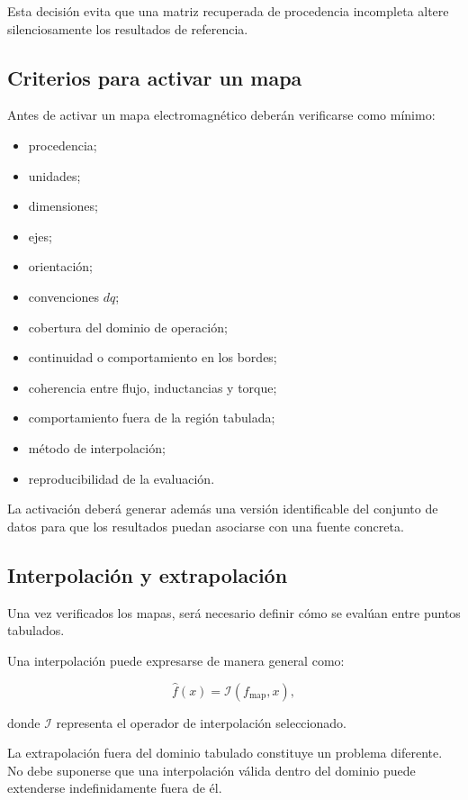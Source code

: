 Esta decisión evita que una matriz recuperada de procedencia incompleta altere silenciosamente los resultados de referencia.

\subsection{Criterios para activar un mapa}

Antes de activar un mapa electromagnético deberán verificarse como mínimo:

\begin{itemize}
\item procedencia;
\item unidades;
\item dimensiones;
\item ejes;
\item orientación;
\item convenciones $dq$;
\item cobertura del dominio de operación;
\item continuidad o comportamiento en los bordes;
\item coherencia entre flujo, inductancias y torque;
\item comportamiento fuera de la región tabulada;
\item método de interpolación;
\item reproducibilidad de la evaluación.
\end{itemize}

La activación deberá generar además una versión identificable del conjunto de datos para que los resultados puedan asociarse con una fuente concreta.

\subsection{Interpolación y extrapolación}

Una vez verificados los mapas, será necesario definir cómo se evalúan entre puntos tabulados.

Una interpolación puede expresarse de manera general como:

\begin{equation}
\hat{f}(x)=\mathcal{I}\left(f_{\mathrm{map}},x\right),
\end{equation}

donde $\mathcal{I}$ representa el operador de interpolación seleccionado.

La extrapolación fuera del dominio tabulado constituye un problema diferente. No debe suponerse que una interpolación válida dentro del dominio puede extenderse indefinidamente fuera de él.

